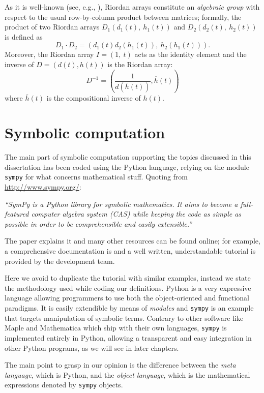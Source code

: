As it is well-known (see, e.g., \citep{LUZON201475,MRSV97,SHAPIRO1991229}),
Riordan arrays constitute an \textit{algebraic group} with respect to the usual
row-by-column product between matrices; formally, the product of two Riordan
arrays $D_1(d_1(t),\ h_1(t))$ and $D_2(d_2(t),\ h_2(t))$ is defined as
\begin{displaymath}
  D_1 \cdot D_2 =(d_1(t)d_2(h_1(t)),\ h_2(h_1(t))).
\end{displaymath}
Moreover, the Riordan array $I = (1,\ t)$ acts as the identity element and the
inverse of $D =(d(t), h(t))$ is the Riordan array:
$$
D^{-1} = \left( \frac{1}{d(\overline{h}(t))},
  \overline{h}(t) \right)
$$
where $\overline{h}(t)$ is the compositional inverse of $h(t)$.

\section{Symbolic computation}

The main part of symbolic computation supporting the topics discussed in this
dissertation has been coded using the Python language, relying on the module
\verb|sympy| for what concerns mathematical stuff. Quoting from \url{http://www.sympy.org/}:
\begin{center}
\textit{ ``SymPy is a Python library for symbolic mathematics. It aims to
become a full-featured computer algebra system (CAS) while keeping the code as
simple as possible in order to be comprehensible and easily extensible.''}
\end{center}
The paper \citep{10.7717/peerj-cs.103} explains it and many other resources can
be found online; for example, a comprehensive documentation is
\citep{sympy:doc} and a well written, understandable tutorial
\citep{sympy:tutorial} is provided by the development team.

Here we avoid to duplicate the tutorial with similar examples, instead we state
the methodology used while coding our definitions. Python is a very expressive
language allowing programmers to use both the object-oriented and functional
paradigms. It is easily extendible by means of \textit{modules} and
\verb|sympy| is an example that targets manipulation of symbolic terms.
Contrary to other software like Maple and Mathematica which ship with their own
languages, \verb|sympy| is implemented entirely in Python, allowing a
transparent and easy integration in other Python programs, as we will see in
later chapters.

The main point to grasp in our opinion is the difference between the
\textit{meta language}, which is Python, and the \textit{object language},
which is the mathematical expressions denoted by \verb|sympy| objects.

